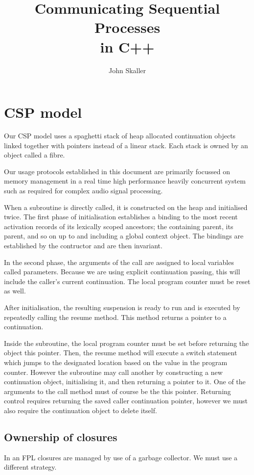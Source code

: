 \documentclass[oneside]{book}
\title{Communicating Sequential Processes\\ in C++}
\author{John Skaller}
\begin{document}
\maketitle
\tableofcontents
\chapter{CSP model}
Our CSP model uses a spaghetti stack of heap allocated continuation
objects linked together with pointers instead of a linear stack.
Each stack is owned by an object called a fibre.

Our usage protocols established in this document are primarily
focussed on memory management in a real time high performance
heavily concurrent system such as required for complex audio
signal processing.

When a subroutine is directly called, it is constructed on
the heap and initialised twice. The first phase of initialisation
establishes a binding to the most recent activation records
of its lexically scoped ancestors; the containing parent,
its parent, and so on up to and including a global context object.
The bindings are established by the contructor and are then invariant.

In the second phase, the arguments of the call are assigned to
local variables called parameters. Because we are using explicit
continuation passing, this will include the caller's current
continuation. The local program counter must be reset as well.

After initialisation, the resulting suspension is ready to run
and is executed by repeatedly calling the resume method.
This method returns a pointer to a continuation.

Inside the subroutine, the local program counter must be set before
returning the object this pointer. Then, the resume method will
execute a switch statement which jumps to the designated location
based on the value in the program counter. However the subroutine
may call another by constructing a new continuation object,
initialising it, and then returning a pointer to it. One of
the arguments to the call method must of course be the this
pointer. Returning control requires returning the saved caller
continuation pointer, however we must also require the continuation
object to delete itself.

\section{Ownership of closures}
In an FPL closures are managed by use of a garbage collector.
We must use a different strategy.
\end{document}
